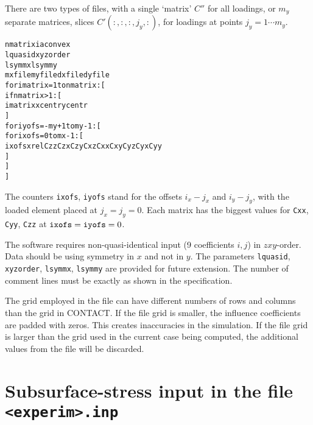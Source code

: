 \documentclass[12pt]{report}
\begin{document}
There are two types of files, with a single `matrix' $C''$ for all
loadings, or $m_y$ separate matrices, slices $C'(:,:,:,j_y,:)$, for
loadings at points $j_y=1\cdots m_y$.
\begin{alltt}
   nmatrix   iaconvex
   lquasid   xyzorder
   lsymmx    lsymmy
   mxfile    myfile   dxfile  dyfile
   % empty/comment line
   % empty/comment line
   for imatrix = 1 to nmatrix: [
      if nmatrix>1: [
         % empty/comment line
         imatrix  xcentr  ycentr
      ]
      for iyofs = -my+1 to my-1: [
         % empty/comment line
         % empty/comment line
         for ixofs = 0 to mx-1: [
            ixofs   xrel   Czz  Czx  Czy   Cxz  Cxx  Cxy   Cyz  Cyx  Cyy 
         ]
      ]
   ]
\end{alltt}
The counters {\tt ixofs}, {\tt iyofs} stand for the offsets $i_x-j_x$ and
$i_y-j_y$, with the loaded element placed at $j_x=j_y=0$. Each matrix has
the biggest values for {\tt Cxx}, {\tt Cyy}, {\tt Czz} at ${\tt ixofs}=
{\tt iyofs}=0$.

The software requires non-quasi-identical input (9 coefficients $i,j$) in
$zxy$-order. Data should be using symmetry in $x$ and not in $y$. The
parameters {\tt lquasid}, {\tt xyzorder}, {\tt lsymmx}, {\tt lsymmy} are
provided for future extension.
The number of comment lines must be exactly as shown in the specification.

The grid employed in the file can have different numbers of rows and
columns than the grid in CONTACT. If the file grid is smaller, the
influence coefficients are padded with zeros. This creates inaccuracies in
the simulation. If the file grid is larger than the grid used in the
current case being computed, the additional values from the file will be
discarded.

\section{Subsurface-stress input in the file {\tt <experim>.inp}}
\label{sec:spec_subsinp}
\end{document}
